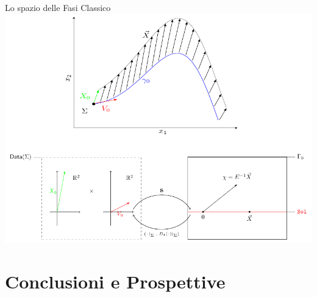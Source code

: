 \documentclass[8pt,handout]{beamer}
\begin{document}
\begin{frame}{Lo spazio delle Fasi Classico}
					\includegraphics[width=\textwidth]{Pictures/Jacobi_GeometricPicturePanoramica}	

\end{frame}	

	


\section*{Conclusioni e Prospettive}
\end{document}
